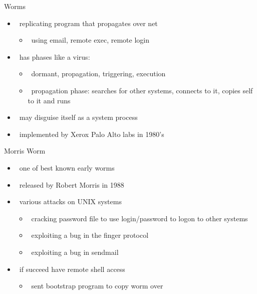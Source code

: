 \documentclass{beamer}
\begin{document}
\begin{frame}{Worms}
  \begin{itemize}
  \item  replicating program that propagates over net 
    \begin{itemize}
    \item  using email, remote exec, remote login 
    \end{itemize}
  \item  has phases like a virus: 
    \begin{itemize}
    \item  dormant, propagation, triggering, execution 
    \item  propagation phase: searches for other systems, connects to 
      it, copies self to it and runs 
    \end{itemize}
  \item  may disguise itself as a system process 
  \item  implemented by Xerox Palo Alto labs in 1980's
  \end{itemize}
\end{frame}

\begin{frame}{Morris Worm}
  \begin{itemize}
  \item  one of best known early worms 
  \item  released by Robert Morris in 1988 
  \item  various attacks on UNIX systems 
    \begin{itemize}
    \item  cracking password file to use login/password to 
      logon to other systems 
    \item  exploiting a bug in the finger protocol 
    \item  exploiting a bug in sendmail 
    \end{itemize}
  \item  if succeed have remote shell access 
    \begin{itemize}
    \item  sent bootstrap program to copy worm over
    \end{itemize}
  \end{itemize}
\end{frame}
\end{document}
